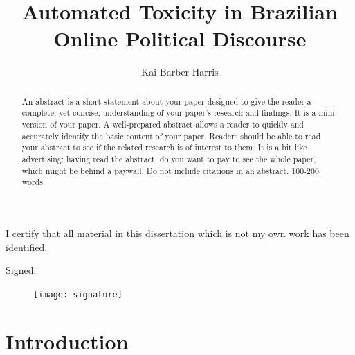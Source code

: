 \documentclass[a4paper,11pt]{article}  %
\title{Automated Toxicity in Brazilian Online Political Discourse}
\author{Kai Barber-Harris}
\begin{document}
	
	\maketitle
	
	\begin{abstract}
		An abstract is a short statement about your paper designed to give the reader a complete, yet 
		concise, understanding of your paper's research and findings. It is a mini-version of your paper.
		A well-prepared abstract allows a reader to quickly and accurately identify the basic content of 
		your paper. Readers should be able to read your abstract to see if the related research is of 
		interest to them.  It is a bit like advertising: having read the abstract, do you want to pay to see the
		whole paper, which might be behind a paywall.
		Do not include citations in an abstract.  100-200 words.
	\end{abstract}
	
	\vfill
	
	\begin{center}
		I certify that all material in this dissertation which is not my own work has been identified.
	\end{center}

	Signed: 
	
	\begin{figure}
		\hspace*{2cm} \texttt{[image: signature]}
		\label{fig:signature}
	\end{figure}
	
	\newpage
	
	\tableofcontents
	
	\newpage
	\section{Introduction}
	\label{sec:intro}
\end{document}
